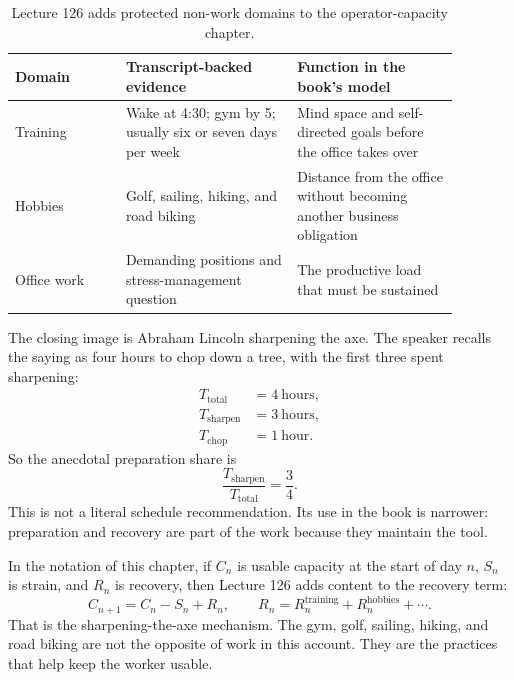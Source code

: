 \documentclass[11pt,oneside]{book}
\begin{document}
\begin{table}
\centering
\small
\begin{tabular}{p{0.22\linewidth}p{0.34\linewidth}p{0.32\linewidth}}
\hline
Domain & Transcript-backed evidence & Function in the book's model\\
\hline
Training & Wake at 4:30; gym by 5; usually six or seven days per week & Mind space and self-directed goals before the office takes over\\
Hobbies & Golf, sailing, hiking, and road biking & Distance from the office without becoming another business obligation\\
Office work & Demanding positions and stress-management question & The productive load that must be sustained\\
\hline
\end{tabular}
\caption{Lecture 126 adds protected non-work domains to the operator-capacity chapter.}
\end{table}

The closing image is Abraham Lincoln sharpening the axe. The speaker recalls the saying as four hours to chop down a tree, with the first three spent sharpening:
\begin{align}
T_{\mathrm{total}}   &= 4\ \text{hours},\\
T_{\mathrm{sharpen}} &= 3\ \text{hours},\\
T_{\mathrm{chop}}    &= 1\ \text{hour}.
\end{align}
So the anecdotal preparation share is
\[
\frac{T_{\mathrm{sharpen}}}{T_{\mathrm{total}}}
=
\frac{3}{4}.
\]
This is not a literal schedule recommendation. Its use in the book is narrower: preparation and recovery are part of the work because they maintain the tool.

In the notation of this chapter, if \(C_n\) is usable capacity at the start of day \(n\), \(S_n\) is strain, and \(R_n\) is recovery, then Lecture 126 adds content to the recovery term:
\[
C_{n+1}=C_n-S_n+R_n,
\qquad
R_n=R_n^{\mathrm{training}}+R_n^{\mathrm{hobbies}}+\cdots.
\]
That is the sharpening-the-axe mechanism. The gym, golf, sailing, hiking, and road biking are not the opposite of work in this account. They are the practices that help keep the worker usable.

\end{document}
